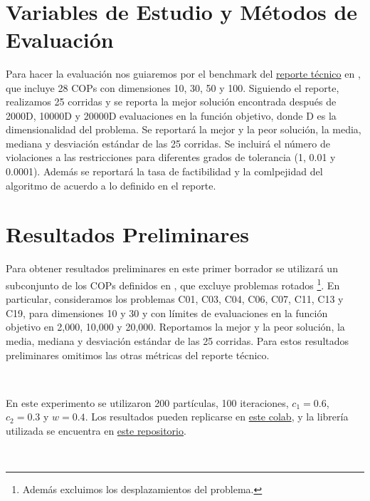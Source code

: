 \documentclass{article}
\begin{document}
\

\newpage
\section*{Variables de Estudio y Métodos de Evaluación}

Para hacer la evaluación nos guiaremos por el benchmark del \href{http://web.mysites.ntu.edu.sg/epnsugan/PublicSite/Shared%20Documents/CEC-2017/Constrained/Technical%20Report%20-%20CEC2017-%20Final.pdf}{reporte técnico} en \cite{suganthan16}, que incluye 28 COPs con dimensiones 10, 30, 50 y 100. Siguiendo el reporte, realizamos 25 corridas y se reporta la mejor solución encontrada después de 2000D, 10000D y 20000D evaluaciones en la función objetivo, donde D es la dimensionalidad del problema. Se reportará la mejor y la peor solución, la media, mediana y desviación estándar de las 25 corridas. Se incluirá el número de violaciones a las restricciones para diferentes grados de tolerancia (1, 0.01 y 0.0001). Además se reportará la tasa de factibilidad y la comlpejidad del algoritmo de acuerdo a lo definido en el reporte.

\newpage
\section*{Resultados Preliminares}

Para obtener resultados preliminares en este primer borrador se utilizará un subconjunto de los COPs definidos en \cite{suganthan16}, que excluye problemas rotados \footnote{Además excluimos los desplazamientos del problema.}. En particular, consideramos los problemas C01, C03, C04, C06, C07, C11, C13 y C19, para dimensiones 10 y 30 y con límites de evaluaciones en la función objetivo en 2,000, 10,000 y 20,000. Reportamos la mejor y la peor solución, la media, mediana y desviación estándar de las 25 corridas. Para estos resultados preliminares omitimos las otras métricas del reporte técnico. 

\

En este experimento se utilizaron 200 partículas, 100 iteraciones, $c_1 = 0.6$, $c_2 = 0.3$ y $w = 0.4$. Los resultados pueden replicarse en \href{https://colab.research.google.com/github/arturomf94/PSO/blob/master/DTPSOCOP.ipynb}{este colab}, y la librería utilizada se encuentra en \href{https://github.com/arturomf94/pyswarms}{este repositorio}.

\
\end{document}
